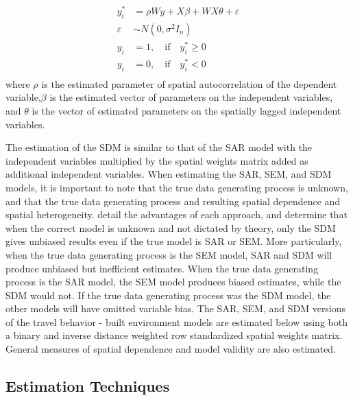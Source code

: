 \begin{equation}
\begin{split}
y^{*}_{i} &= \rho W y + X\beta + WX\theta + \varepsilon \\
\varepsilon &\sim N(0, \sigma^{2}I_n) \\
y_i &= 1,\quad \text{if} \quad y^{*}_{i} \geq 0\\
y_i &= 0,\quad  \text{if} \quad  y^{*}_{i} < 0  \\
\end{split}
\end{equation}%
%
where $\rho$ is the estimated parameter of spatial autocorrelation of the dependent variable,$\beta$ is the estimated vector of parameters on the independent variables, and $\theta$ is the vector of estimated parameters on the spatially lagged independent variables.

The estimation of the SDM is similar to that of the SAR model with the independent variables multiplied by the spatial weights matrix added as additional independent variables.  When estimating the SAR, SEM, and SDM models, it is important to note that the true data generating process is unknown, and that the true data generating process and resulting spatial dependence and spatial heterogeneity.  \cite{LeSage2009} detail the advantages of each approach, and determine that when the correct model is unknown and not dictated by theory, only the SDM gives unbiased results even if the true model is SAR or SEM.  More particularly, when the true data generating process is the SEM model, SAR and SDM will produce unbiased but inefficient estimates.  When the true data generating process is the SAR model, the SEM model produces biased estimates, while the SDM would not.  If the true data generating process was the SDM model, the other models will have omitted variable bias.  The SAR, SEM, and SDM  versions of the travel behavior - built environment models are estimated below using both a binary and inverse distance weighted row standardized spatial weights matrix.  General measures of spatial dependence and model validity are also estimated. 

\subsection{Estimation Techniques}

